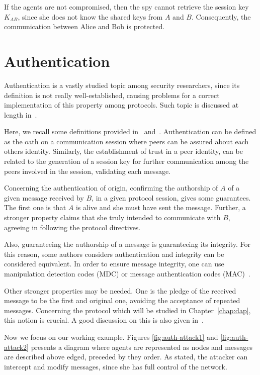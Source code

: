 If the agents are not compromised, then the spy cannot retrieve the session key \(K_{AB}\), since she does not know the shared keys from \(A\) and \(B\). Consequently, the communication between Alice and Bob is protected.





\section{Authentication}\label{sec:protocols:auth}
Authentication is a vastly studied topic among security researchers, since its definition is not really well-established, causing problems for a correct implementation of this property among protocols. Such topic is discussed at length in~\cite{Gollmann2000}.

Here, we recall some definitions provided in~\cite{Diffie92} and~\cite{RyanSchneider2010}. Authentication can be defined as the oath on a communication session where peers can be assured about each others identity. Similarly, the establishment of trust in a peer identity, can be related to the generation of a session key for further communication among the peers involved in the session, validating each message.

Concerning the authentication of origin, confirming the authorship of \(A\) of a given message received by \(B\), in a given protocol session, gives some guarantees. The first one is that \(A\) is alive and she must have sent the message. Further, a stronger property claims that she truly intended to communicate with \(B\), agreeing in following the protocol directives.

Also, guaranteeing the authorship of a message is guaranteeing its integrity. For this reason, some authors \cite{Bella2007} considers authentication and integrity can be considered equivalent. In order to ensure message integrity, one can use manipulation detection codes (MDC) or message authentication codes (MAC)~\cite{ross-security}.

Other stronger properties may be needed. One is the pledge of the received message to be the first and original one, avoiding the acceptance of repeated messages. Concerning the protocol which will be studied in Chapter~\ref{chap:dap}, this notion is crucial. A good discussion on this is also given in~\cite{Gollmann2000}.

Now we focus on our working example. Figures \ref{fig:auth-attack1} and \ref{fig:auth-attack2} presents a diagram where agents are represented as nodes and messages are described above edged, preceded by they order. As stated, the attacker can intercept and modify messages, since she has full control of the network.

